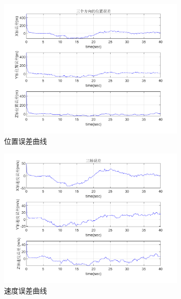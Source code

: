 \documentclass[12pt]{article}
\numberwithin{equation}{section} %
\begin{document}
\begin{figure}  %
    \centering
    \includegraphics[width=0.8\textwidth]{Fig/位置误差曲线.png} %
    \caption{位置误差曲线}
    \label{fig:位置误差曲线} %
\end{figure}

\begin{figure}  %
    \centering
    \includegraphics[width=0.8\textwidth]{Fig/速度误差曲线.png} %
    \caption{速度误差曲线}
\end{figure}
\end{document}
